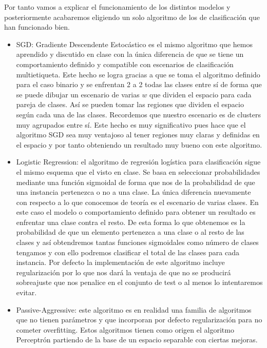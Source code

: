 \documentclass[12pt,a4paper]{article}
\begin{document}
Por tanto vamos a explicar el funcionamiento de los distintos modelos y posteriormente acabaremos eligiendo un solo algoritmo de los de clasificación que han funcionado bien.

\begin{itemize}
	\item SGD: Gradiente Descendente Estocástico es el mismo algoritmo que hemos aprendido y discutido en clase con la única diferencia de que se tiene un comportamiento definido y compatible con escenarios de clasificación multietiqueta. Este hecho se logra gracias a que se toma el algoritmo definido para el caso binario y se enfrentan 2 a 2 todas las clases entre sí de forma que se puede dibujar un escenario de varias $w$ que dividen el espacio para cada pareja de clases. Así se pueden tomar las regiones que dividen el espacio según cada una de las clases. Recordemos que nuestro escenario es de clusters muy agrupados entre sí. Este hecho es muy significativo pues hace que el algoritmo SGD sea muy ventajoso al tener regiones muy claras y definidas en el espacio y por tanto obteniendo un resultado muy bueno con este algoritmo.
	\item Logistic Regression: el algoritmo de regresión logística para clasificación sigue el mismo esquema que el visto en clase. Se basa en seleccionar probabilidades mediante una función sigmoidal de forma que nos de la probabilidad de que una instancia pertenezca o no a una clase. La única diferencia nuevamente con respecto a lo que conocemos de teoría es el escenario de varias clases. En este caso el modelo o comportamiento definido para obtener un resultado es enfrentar una clase contra el resto. De esta forma lo que obtenemos es la probabilidad de que un elemento pertenezca a una clase o al resto de las clases y así obtendremos tantas funciones sigmoidales como número de clases tengamos y con ello podremos clasificar el total de las clases para cada instancia. Por defecto la implementación de este algoritmo incluye regularización por lo que nos dará la ventaja de que no se producirá sobreajuste que nos penalice en el conjunto de test o al menos lo intentaremos evitar.
	\item Passive-Aggressive: este algoritmo es en realidad una familia de algoritmos que no tienen parámetros y que incorporan por defecto regularización para no cometer overfitting. Estos algoritmos tienen como origen el algoritmo Perceptrón partiendo de la base de un espacio separable con ciertas mejoras.

\end{itemize}
\end{document}
